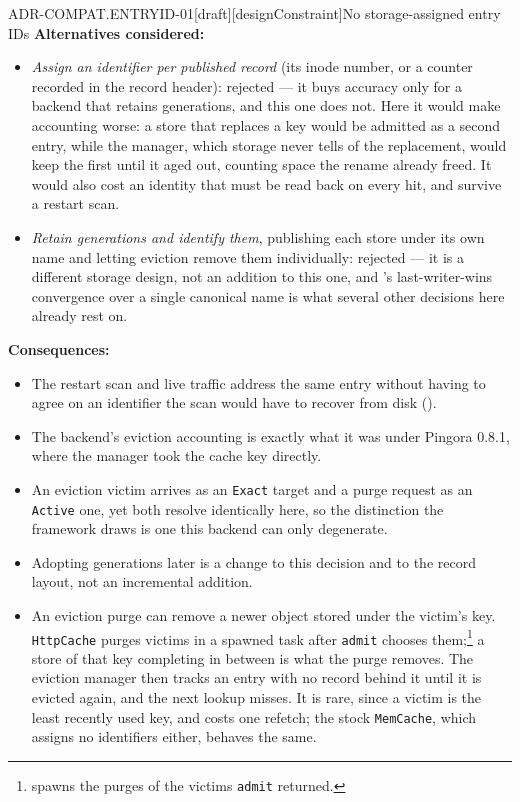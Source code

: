 \begin{requirement}{ADR-COMPAT.ENTRYID-01}[draft][designConstraint]{No storage-assigned entry IDs}
  \textbf{Alternatives considered:}
  \begin{itemize}
    \item \emph{Assign an identifier per published record} (its inode number, or
      a counter recorded in the record header): rejected --- it buys accuracy
      only for a backend that retains generations, and this one does not. Here
      it would make accounting worse: a store that replaces a key would be
      admitted as a second entry, while the manager, which storage never tells
      of the replacement, would keep the first until it aged out, counting
      space the rename already freed. It would also cost an identity that must
      be read back on every hit, and survive a restart scan.
    \item \emph{Retain generations and identify them}, publishing each store
      under its own name and letting eviction remove them individually:
      rejected --- it is a different storage design, not an addition to this
      one, and 's last-writer-wins
      convergence over a single canonical name is what several other decisions
      here already rest on.
  \end{itemize}

  \textbf{Consequences:}
  \begin{itemize}
    \item[+] The restart scan and live traffic address the same entry without
      having to agree on an identifier the scan would have to recover from disk
      ().
    \item[+] The backend's eviction accounting is exactly what it was under
      Pingora 0.8.1, where the manager took the cache key directly.
    \item[--] An eviction victim arrives as an \texttt{Exact} target and a purge
      request as an \texttt{Active} one, yet both resolve identically here, so
      the distinction the framework draws is one this backend can only
      degenerate.
    \item[--] Adopting generations later is a change to this decision and to the
      record layout, not an incremental addition.
    \item[--] An eviction purge can remove a newer object stored under the
      victim's key. \texttt{HttpCache} purges victims in a spawned task after
      \texttt{admit} chooses them;\footnote{ spawns the purges of the victims
      \texttt{admit} returned.} a store of that key completing in between is
      what the purge removes. The eviction manager then tracks an entry with no
      record behind it until it is evicted again, and the next lookup misses.
      It is rare, since a victim is the least recently used key, and costs one
      refetch; the stock \texttt{MemCache}, which assigns no identifiers
      either, behaves the same.
  \end{itemize}


\end{requirement}
